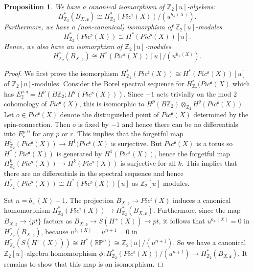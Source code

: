 \documentclass{amsart}
\newtheorem{proposition}[theorem]{Proposition}
\theoremstyle{definition}
\theoremstyle{remark}
\numberwithin{equation}{section}
\begin{document}
\begin{proposition}\label{prop:z2cohom}
We have a canonical isomorphism of $\mathbb{Z}_2[u]$-algebras:
\[
H^*_{\mathbb{Z}_2}(B_{X,\mathfrak{s}}) \cong H^*_{\mathbb{Z}_2}( Pic^{\mathfrak{s}}(X))/( u^{b_+(X)}).
\]
Furthermore, we have a (non-canonical) isomorphism of $\mathbb{Z}_2[u]$-modules
\[
H^*_{\mathbb{Z}_2}( Pic^{\mathfrak{s}}(X) ) \cong H^*( Pic^{\mathfrak{s}}(X) )[u].
\]
Hence, we also have an isomorphism of $\mathbb{Z}_2[u]$-modules
\[
H^*_{\mathbb{Z}_2}(B_{X,\mathfrak{s}}) \cong H^*(Pic^{\mathfrak{s}}(X))[u]/(u^{b_+(X)}).
\]
\end{proposition}
\begin{proof}
We first prove the isomorphism $H^*_{\mathbb{Z}_2}( Pic^{\mathfrak{s}}(X) ) \cong H^*( Pic^{\mathfrak{s}}(X) )[u]$ of $\mathbb{Z}_2[u]$-modules. Consider the Borel spectral sequence for $H^*_{\mathbb{Z}_2}( Pic^{\mathfrak{s}}(X)$ which has $E_2^{p,q} = H^p( B\mathbb{Z}_2 ; H^q(Pic^{\mathfrak{s}}(X)) )$. Since $-1$ acts trivially on the mod $2$ cohomology of $Pic^{\mathfrak{s}}(X)$, this is isomorphic to $H^p(B\mathbb{Z}_2 ) \otimes_{\mathbb{Z}_2} H^q( Pic^{\mathfrak{s}}(X) )$. Let $o \in Pic^{\mathfrak{s}}(X)$ denote the distinguished point of $Pic^{\mathfrak{s}}(X)$ determined by the spin-connection. Then $o$ is fixed by $-1$ and hence there can be no differentials into $E_r^{p,0}$ for any $p$ or $r$. This implies that the forgetful map $H^1_{\mathbb{Z}_2}( Pic^{\mathfrak{s}}(X) ) \to H^1( Pic^{\mathfrak{s}}(X)$ is surjective. But $Pic^{\mathfrak{s}}(X)$ is a torus so $H^*( Pic^{\mathfrak{s}}(X))$ is generated by $H^1( Pic^{\mathfrak{s}}(X))$, hence the forgetful map $H^k_{\mathbb{Z}_2}( Pic^{\mathfrak{s}}(X) ) \to H^k( Pic^{\mathfrak{s}}(X))$ is surjective for all $k$. This implies that there are no differentials in the spectral sequence and hence $H^*_{\mathbb{Z}_2}( Pic^{\mathfrak{s}}(X) ) \cong H^*( Pic^{\mathfrak{s}}(X) )[u]$ as $\mathbb{Z}_2[u]$-modules. 

Set $n = b_+(X)-1$. The projection $B_{X , \mathfrak{s}} \to Pic^{\mathfrak{s}}(X)$ induces a canonical homomorphism $H^*_{\mathbb{Z}_2}( Pic^{\mathfrak{s}}(X) ) \to H^*_{\mathbb{Z}_2}(B_{X,\mathfrak{s}})$. Furthermore, since the map $B_{X,\mathfrak{s}} \to \{pt \}$ factors as $B_{X,\mathfrak{s}} \to S(H^+(X)) \to pt$, it follows that $u^{b_+(X)} = 0$ in $H^*_{\mathbb{Z}_2}(B_{X,\mathfrak{s}})$, because $u^{b_+(X)} = u^{n+1} = 0$ in $H^*_{\mathbb{Z}_2}( S(H^+(X)) ) \cong H^*( \mathbb{RP}^n ) \cong \mathbb{Z}_2[u]/(u^{n+1})$. So we have a canonical $\mathbb{Z}_2[u]$-algebra homomorphism $\phi : H^*_{\mathbb{Z}_2}( Pic^{\mathfrak{s}}(X) )/(u^{n+1}) \to H^*_{\mathbb{Z}_2}( B_{X,\mathfrak{s}})$. It remains to show that this map is an isomorphism.


\end{proof}
\end{document}
